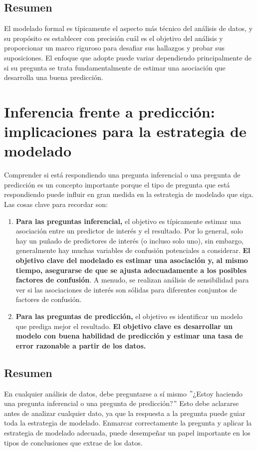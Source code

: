 \documentclass[10pt]{book}
\begin{document}
    \section{Resumen}
    El modelado formal es típicamente el aspecto más técnico del análisis de datos, y su propósito es establecer con precisión cuál es el objetivo del análisis y proporcionar un marco riguroso para desafiar sus hallazgos y probar sus suposiciones. El enfoque que adopte puede variar dependiendo principalmente de si su pregunta se trata fundamentalmente de estimar una asociación que desarrolla una buena predicción.

\chapter{Inferencia frente a predicción: implicaciones para la estrategia de modelado}
Comprender si está respondiendo una pregunta inferencial o una pregunta de predicción es un concepto importante porque el tipo de pregunta que está respondiendo puede influir en gran medida en la estrategia de modelado que siga. Las cosas clave para recordar son:
\begin{enumerate}[\bfseries 1.]
    \item \textbf{Para las preguntas inferencial,} el objetivo es típicamente estimar una asociación entre un predictor de interés y el resultado. Por lo general, solo hay un puñado de predictores de interés (o incluso solo uno), sin embargo, generalmente hay muchas variables de confusión potenciales a considerar. \textbf{El objetivo clave del modelado es estimar una asociación y, al mismo tiempo, asegurarse de que se ajusta adecuadamente a los posibles factores de confusión}. A menudo, se realizan análisis de sensibilidad para ver si las asociaciones de interés son sólidas para diferentes conjuntos de factores de confusión.
    \item \textbf{Para las preguntas de predicción,} el objetivo es identificar un modelo que prediga mejor el resultado. \textbf{El objetivo clave es desarrollar un modelo con buena habilidad de predicción y estimar una tasa de error razonable a partir de los datos.}
\end{enumerate}
    \section{Resumen}
    En cualquier análisis de datos, debe preguntarse a sí mismo $"$¿Estoy haciendo una pregunta inferencial o una pregunta de predicción?$"$ Esto debe aclararse antes de analizar cualquier dato, ya que la respuesta a la pregunta puede guiar toda la estrategia de modelado. Enmarcar correctamente la pregunta y aplicar la estrategia de modelado adecuada, puede desempeñar un papel importante en los tipos de conclusiones que extrae de los datos.
\end{document}
